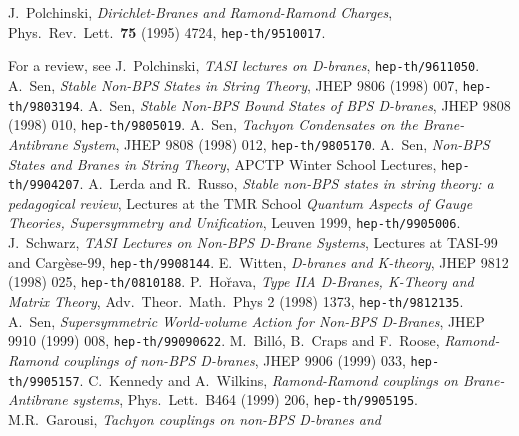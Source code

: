 \documentclass[12pt,a4paper]{article}
\begin{document}
\begin{thebibliography}{99}


 J.~Polchinski,
             {\it Dirichlet-Branes and Ramond-Ramond Charges},
             {Phys.~Rev.~Lett.}~{\bf 75} (1995) 4724,
             {\tt hep-th/9510017}.

  For a review, see J.~Polchinski,
               {\sl TASI lectures on D-branes},
               {\tt hep-th/9611050}.
 A.~Sen,
               {\it Stable Non-BPS States in String Theory},
               JHEP 9806 (1998) 007,
               {\tt hep-th/9803194}.
 A.~Sen,
               {\it Stable Non-BPS Bound States of BPS D-branes},
               JHEP 9808 (1998) 010,
               {\tt hep-th/9805019}.
 A.~Sen,
               {\it Tachyon Condensates on the Brane-Antibrane System},
               JHEP 9808 (1998) 012,
               {\tt hep-th/9805170}.
 A.~Sen,
               {\it Non-BPS States and Branes in String Theory},
               APCTP Winter School Lectures,
               {\tt hep-th/9904207}.
A.~Lerda and R.~Russo,
               {\it Stable non-BPS states in string theory: a pedagogical
                 review},
               Lectures at the TMR School {\it Quantum Aspects of Gauge
                   Theories, Supersymmetry and Unification}, Leuven 1999,
               {\tt hep-th/9905006}.
   J.~Schwarz,
               {\it TASI Lectures on Non-BPS D-Brane Systems},
               Lectures at TASI-99 and Carg\`ese-99,
               {\tt hep-th/9908144}.
 E.~Witten,
               {\it D-branes and K-theory},
               JHEP 9812 (1998) 025,
               {\tt hep-th/0810188}.
  P.~Ho\u rava,
               {\it Type IIA D-Branes, K-Theory and Matrix Theory},
               Adv.~Theor.~Math.~Phys 2 (1998) 1373,
               {\tt hep-th/9812135}.
 A.~Sen,
               {\it Supersymmetric World-volume Action for Non-BPS D-Branes},
               JHEP 9910 (1999) 008,
               {\tt hep-th/99090622}.
M.~Bill\'o, B.~Craps and F.~Roose,
               {\it Ramond-Ramond couplings of non-BPS D-branes},
               JHEP 9906 (1999) 033,
               {\tt hep-th/9905157}.
  C.~Kennedy and A.~Wilkins,
               {\it Ramond-Ramond couplings on Brane-Antibrane systems},
               Phys.~Lett.~B464 (1999) 206,
               {\tt hep-th/9905195}.
  M.R.~Garousi,
               {\it Tachyon couplings on non-BPS D-branes and
}
\end{thebibliography}
\end{document}

